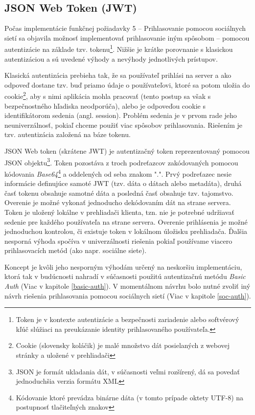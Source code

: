 \documentclass[12pt,oneside]{fithesis2}
\begin{document}
		\subsection{JSON Web Token (JWT)} \label{jwt}
	\par Počas implementácie funkčnej požiadavky 5 -- Prihlasovanie pomocou sociálnych sietí sa objavila možnosť implementovať prihlasovanie iným spôsobom -- pomocou autentizácie na základe tzv. tokenu\footnote{Token je v kontexte autentizácie a bezpečnosti  zariadenie alebo softvérový kľúč slúžiaci na preukázanie identity prihlasovaného používateľa.}. Nižšie je krátke porovnanie s klasickou autentizáciou a sú uvedené výhody a nevýhody jednotlivých prístupov.
	\par Klasická autentizácia prebieha tak, že sa používateľ prihlási na server a ako odpoveď dostane tzv. buď priamo údaje o používateľovi, ktoré sa potom uložia do cookie\footnote{Cookie (slovensky koláčik) je malé množstvo dát posielaných z webovej stránky a uložené v prehliadači}, aby s nimi aplikácia mohla pracovať (tento postup sa však s bezpečnostného hľadiska neodporúča), alebo je odpoveďou cookie s identifikátorom sedenia (angl. session). Problém sedenia je v prvom rade jeho neuniverzálnosť, pokiaľ chceme použiť viac spôsobov prihlasovania. Riešením je tzv. autentizácia založená na báze tokenu\cite{yt14}.
	\par JSON Web token (skrátene JWT) je autentizačný token reprezentovaný pomocou JSON objektu\footnote{JSON je formát ukladania dát, v súčasnosti veľmi rozšírený, dá sa povedať jednoduchšia verzia formátu XML}. Token pozostáva z troch podreťazcov zakódovaných pomocou kódovania \textit{Base64}\footnote{Kódovanie ktoré prevádza binárne dáta (v tomto prípade oktety UTF-8) na postupnosť tlačiteľných znakov} a oddelených od seba znakom ".". Prvý podreťazec nesie informácie definujúce samoté JWT (tzv. dáta o dátach alebo metadáta), druhá časť tokenu obsahuje samotné dáta a posledná časť obsahuje tzv. tajomstvo. Overenie je možné vykonať jednoducho dekódovaním dát na strane servera. Token je uložený lokálne v prehliadači klienta, tzn. nie je potrebné udržiavať sedenie pre každého používateľa na strane servera. Overenie prihlásenia je možné jednoduchou kontrolou, či existuje token v lokálnom úložisku prehliadača\cite{jwtrfc}. Ďalšia nesporná výhoda spočíva v univerzálnosti riešenia pokiaľ používame viacero prihlasovacích metód (ako napr. sociálne siete).
	\par Koncept je kvôli jeho nesporným výhodám určený na neskoršiu implementáciu, ktorá tak v budúcnosti nahradí v súčasnosti použitú autentizačnú metódu \textit{Basic Auth} (Viac v kapitole \ref{basic-auth}). V momentálnom návrhu bolo nutné zvoliť iný návrh riešenia prihlasovania pomocou sociálnych sietí (Viac v kapitole \ref{soc-auth}).
	
\end{document}
